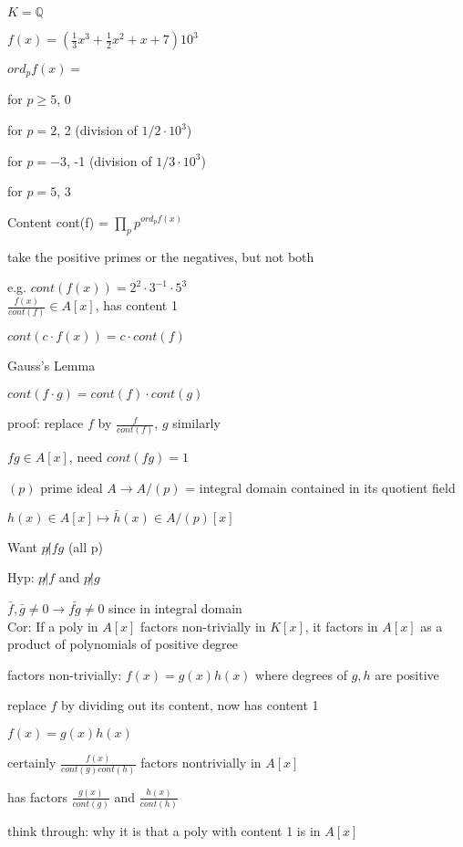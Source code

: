 \documentclass[12pt]{article}
\begin{document}
$K = \mathds{Q}$

$f(x) = (\frac{1}{3}x^3 + \frac{1}{2}x^2 + x + 7)10^3$

$ord_pf(x) = $

for $p \geq 5$, $0$

for $p = 2$, 2 (division of $1/2 \cdot 10^3$)

for $p = -3$, -1 (division of $1/3 \cdot 10^3$)

for $p = 5$, 3

\noindent
Content cont(f) = $\prod_p p^{ord_{p}f(x)}$

take the positive primes or the negatives, but not both

e.g. $cont(f(x)) = 2^2 \cdot 3^{-1} \cdot 5^3$\\

\noindent
$\frac{f(x)}{cont(f)} \in A[x]$, has content 1

\noindent
$cont(c \cdot f(x)) = c \cdot cont(f)$

\noindent
Gauss's Lemma

$cont(f \cdot g) = cont(f) \cdot cont(g)$

proof: replace $f$ by $\frac{f}{cont(f)}$, $g$ similarly

$fg \in A[x]$, need $cont(fg) = 1$

$(p)$ prime ideal $A \to A/(p)$ = integral domain contained in its quotient field

$h(x) \in A[x] \mapsto \bar{h}(x) \in A/(p) [x]$

Want $p \not | fg$ (all p)

Hyp: $p \not |f$ and $p \not |g$

$\bar{f}, \bar{g} \neq 0 \to \bar{fg} \neq 0$ since in integral domain\\

\noindent
Cor: If a poly in $A[x]$ factors non-trivially in $K[x]$, it factors in $A[x]$ as a product of polynomials of positive degree

factors non-trivially: $f(x) = g(x)h(x)$ where degrees of $g, h$ are positive

replace $f$ by dividing out its content, now has content 1

$f(x) = g(x)h(x)$

certainly $\frac{f(x)}{cont(g)cont(h)}$ factors nontrivially in $A[x]$

has factors $\frac{g(x)}{cont(g)}$ and $\frac{h(x)}{cont(h)}$

think through: why it is that a poly with content 1 is in $A[x]$
\end{document}
